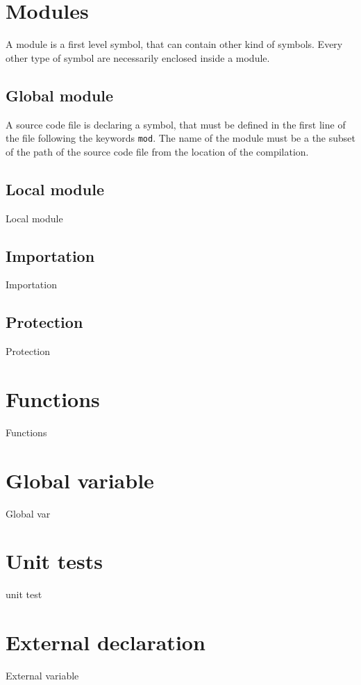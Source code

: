 \section{Modules}%
\label{sec:modules}

A module is a first level symbol, that can contain other kind of symbols. Every
other type of symbol are necessarily enclosed inside a module.

\subsection{Global module}

A source code file is declaring a symbol, that must be defined in the first line
of the file following the keywords \texttt{mod}. The name of the module must be
a the subset of the path of the source code file from the location of the
compilation.

\subsection{Local module}

Local module

\subsection{Importation}

Importation

\subsection{Protection}

Protection

\section{Functions}%
\label{sec:functions}

Functions

\section{Global variable}%
\label{sec:global_variables}

Global var

\section{Unit tests}%
\label{sec:unit_test}

unit test

\section{External declaration}%
\label{sec:extern_var}

External variable

